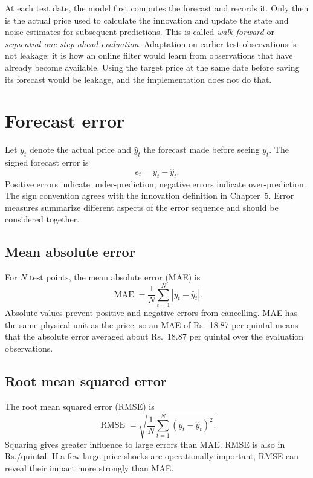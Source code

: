 \documentclass[12pt,a4paper,oneside]{report}
\numberwithin{equation}{chapter}
\numberwithin{figure}{chapter}
\numberwithin{table}{chapter}
\theoremstyle{definition}
\theoremstyle{plain}
\newcommand{\1}{\mathbf{1}}
\newcommand{\hatt}[1]{\widehat{#1}}
\begin{document}
At each test date, the model first computes the forecast and records it. Only then is the actual price used to calculate the innovation and update the state and noise estimates for subsequent predictions. This is called \emph{walk-forward} or \emph{sequential one-step-ahead evaluation}. Adaptation on earlier test observations is not leakage: it is how an online filter would learn from observations that have already become available. Using the target price at the same date before saving its forecast would be leakage, and the implementation does not do that.

\section{Forecast error}
Let $y_t$ denote the actual price and $\hatt{y}_t$ the forecast made before seeing $y_t$. The signed forecast error is
\begin{equation}
  e_t=y_t-\hatt{y}_t.
\end{equation}
Positive errors indicate under-prediction; negative errors indicate over-prediction. The sign convention agrees with the innovation definition in Chapter~5. Error measures summarize different aspects of the error sequence and should be considered together.

\subsection{Mean absolute error}
For $N$ test points, the mean absolute error (MAE) is
\begin{equation}
  \operatorname{MAE}=\frac{1}{N}\sum_{t=1}^{N}|y_t-\hatt{y}_t|.
  \label{eq:mae}
\end{equation}
Absolute values prevent positive and negative errors from cancelling. MAE has the same physical unit as the price, so an MAE of Rs.\ 18.87 per quintal means that the absolute error averaged about Rs.\ 18.87 per quintal over the evaluation observations.

\subsection{Root mean squared error}
The root mean squared error (RMSE) is
\begin{equation}
  \operatorname{RMSE}=\sqrt{\frac{1}{N}\sum_{t=1}^{N}(y_t-\hatt{y}_t)^2}.
  \label{eq:rmse}
\end{equation}
Squaring gives greater influence to large errors than MAE. RMSE is also in Rs./quintal. If a few large price shocks are operationally important, RMSE can reveal their impact more strongly than MAE.
\end{document}
